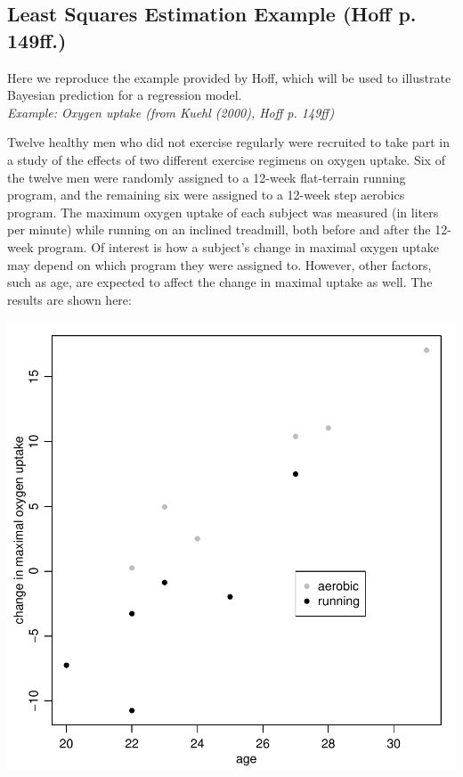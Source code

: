 \documentclass[12pt, a4paper]{article}
\begin{document}
\subsection{Least Squares Estimation Example (Hoff p. 149ff.)}

\noindent Here we reproduce the example provided by Hoff, which will be used to illustrate Bayesian prediction for a regression model.\\

\noindent\textit{Example:  Oxygen uptake (from Kuehl (2000), Hoff p. 149ff)}

\noindent Twelve healthy men who did not exercise regularly were recruited to take part in a study of the effects of two different exercise regimens on oxygen uptake.  Six of the twelve men were randomly assigned to a 12-week flat-terrain running program, and the remaining six were assigned to a 12-week step aerobics program.  The maximum oxygen uptake of each subject was measured (in liters per minute) while running on an inclined treadmill, both before and after the 12-week program.  Of interest is how a subject's change in maximal oxygen uptake may depend on which program they were assigned to.  However, other factors, such as age, are expected to affect the change in maximal uptake as well.  The results are shown here:

\includegraphics{Thesis_v3-011}
\end{document}
